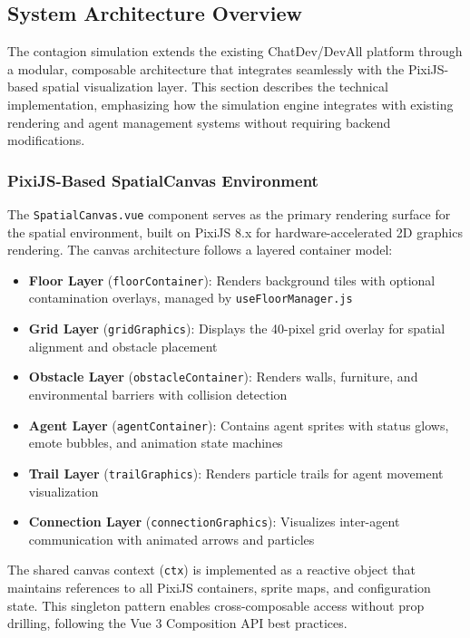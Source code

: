 \subsection{System Architecture Overview}
\label{sec:system-architecture}

The contagion simulation extends the existing ChatDev/DevAll platform through a modular, composable architecture that integrates seamlessly with the PixiJS-based spatial visualization layer. This section describes the technical implementation, emphasizing how the simulation engine integrates with existing rendering and agent management systems without requiring backend modifications.

\subsubsection{PixiJS-Based SpatialCanvas Environment}
\label{sec:spatialcanvas}

The \texttt{SpatialCanvas.vue} component serves as the primary rendering surface for the spatial environment, built on PixiJS 8.x for hardware-accelerated 2D graphics rendering. The canvas architecture follows a layered container model:

\begin{itemize}
    \item \textbf{Floor Layer} (\texttt{floorContainer}): Renders background tiles with optional contamination overlays, managed by \texttt{useFloorManager.js}
    \item \textbf{Grid Layer} (\texttt{gridGraphics}): Displays the 40-pixel grid overlay for spatial alignment and obstacle placement
    \item \textbf{Obstacle Layer} (\texttt{obstacleContainer}): Renders walls, furniture, and environmental barriers with collision detection
    \item \textbf{Agent Layer} (\texttt{agentContainer}): Contains agent sprites with status glows, emote bubbles, and animation state machines
    \item \textbf{Trail Layer} (\texttt{trailGraphics}): Renders particle trails for agent movement visualization
    \item \textbf{Connection Layer} (\texttt{connectionGraphics}): Visualizes inter-agent communication with animated arrows and particles
\end{itemize}

The shared canvas context (\texttt{ctx}) is implemented as a reactive object that maintains references to all PixiJS containers, sprite maps, and configuration state. This singleton pattern enables cross-composable access without prop drilling, following the Vue 3 Composition API best practices.


